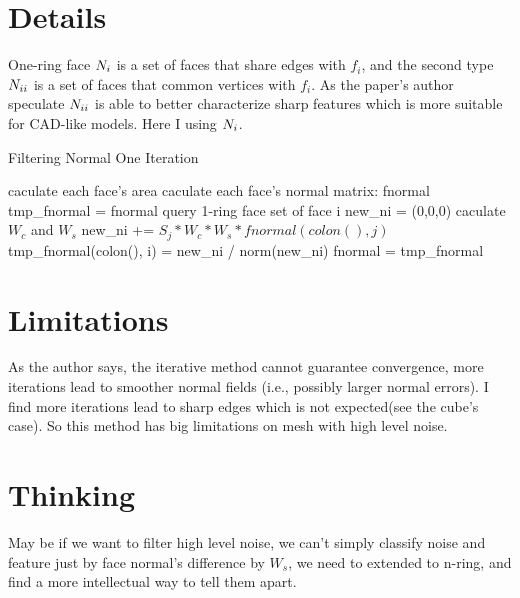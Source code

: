 \documentclass{article}
\theoremstyle{definition}
\theoremstyle{remark}
\newcommand{\rom}[1]{\uppercase\expandafter{\romannumeral #1\relax}}
\begin{document}
\section{Details}
One-ring face $N_{\rom{1}}$ is a set of faces that share edges with $f_i$, and the second type $N_{\rom{2}}$ is a set of faces that common vertices with $f_i$. As the paper's author speculate $N_{\rom{2}}$ is able to better characterize sharp features which is more suitable for CAD-like models. Here I using $N_{\rom{1}}$.
\begin{algorithm}
\caption{Filtering Normal One Iteration}\label{euclid}
\begin{algorithmic}
 \State caculate each face's area
 \State caculate each face's normal matrix: fnormal
 \State tmp\_fnormal = fnormal
 \EndProcedure
 \State query 1-ring face set of face i
 \State new\_ni = (0,0,0)
 \State caculate $W_c$  and $W_s$
 \State new\_ni += $S_j*W_c*W_s*fnormal(colon(), j)$
 \EndFor
 \State tmp\_fnormal(colon(), i) = new\_ni / norm(new\_ni)
\EndFor
\State fnormal = tmp\_fnormal
\end{algorithmic}
\end{algorithm}
\section{Limitations}
As the author says, the iterative method cannot guarantee convergence, more iterations lead to smoother normal fields (i.e., possibly larger normal errors). I find more iterations lead to sharp edges which is not expected(see the cube's case). So this method has big limitations on mesh with high level noise.
\section{Thinking}
May be if we want to filter high level noise, we can't simply classify noise and feature just by face normal's difference by $W_s$,
we need to extended to n-ring, and find a more intellectual way to tell them apart.







\end{document}
